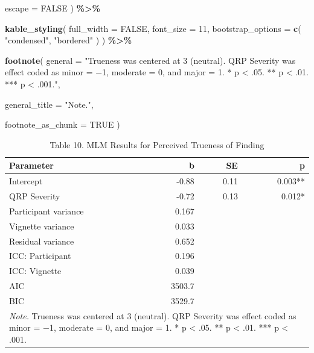 \documentclass[
]{article}
\newenvironment{Shaded}{\begin{snugshade}}{\end{snugshade}}
\newcommand{\AttributeTok}[1]{\textcolor[rgb]{0.13,0.29,0.53}{#1}}
\newcommand{\ConstantTok}[1]{\textcolor[rgb]{0.56,0.35,0.01}{#1}}
\newcommand{\DecValTok}[1]{\textcolor[rgb]{0.00,0.00,0.81}{#1}}
\newcommand{\FunctionTok}[1]{\textcolor[rgb]{0.13,0.29,0.53}{\textbf{#1}}}
\newcommand{\NormalTok}[1]{#1}
\newcommand{\SpecialCharTok}[1]{\textcolor[rgb]{0.81,0.36,0.00}{\textbf{#1}}}
\newcommand{\StringTok}[1]{\textcolor[rgb]{0.31,0.60,0.02}{#1}}
\begin{document}
\begin{Shaded}
\begin{Highlighting}[]
    \AttributeTok{escape =} \ConstantTok{FALSE}
\NormalTok{  ) }\SpecialCharTok{\%\textgreater{}\%}

  \FunctionTok{kable\_styling}\NormalTok{(}
    \AttributeTok{full\_width =} \ConstantTok{FALSE}\NormalTok{,}
    \AttributeTok{font\_size =} \DecValTok{11}\NormalTok{,}
    \AttributeTok{bootstrap\_options =}
      \FunctionTok{c}\NormalTok{(}
        \StringTok{"condensed"}\NormalTok{,}
        \StringTok{"bordered"}
\NormalTok{      )}
\NormalTok{  ) }\SpecialCharTok{\%\textgreater{}\%}

  \FunctionTok{footnote}\NormalTok{(}
    \AttributeTok{general =}
      \StringTok{"Trueness was centered at 3 (neutral). QRP Severity was effect coded as minor = −1, moderate = 0, and major = 1. * p \textless{} .05. ** p \textless{} .01. *** p \textless{} .001."}\NormalTok{,}

    \AttributeTok{general\_title =}
      \StringTok{"Note."}\NormalTok{,}

    \AttributeTok{footnote\_as\_chunk =}
      \ConstantTok{TRUE}
\NormalTok{  )}
\end{Highlighting}
\end{Shaded}

\begingroup\fontsize{11}{13}\selectfont

\begin{longtable}[t]{lrrr}
\caption{\label{tab:trueness-table}Table 10. MLM Results for Perceived Trueness of Finding}\\
\toprule
Parameter & b & SE & p\\
\midrule
Intercept & -0.88 & 0.11 & 0.003**\\
QRP Severity & -0.72 & 0.13 & 0.012*\\
Participant variance & 0.167 &  & \\
Vignette variance & 0.033 &  & \\
Residual variance & 0.652 &  & \\
\addlinespace
ICC: Participant & 0.196 &  & \\
ICC: Vignette & 0.039 &  & \\
AIC & 3503.7 &  & \\
BIC & 3529.7 &  & \\
\bottomrule
\multicolumn{4}{l}{\rule{0pt}{1em}\textit{Note.} Trueness was centered at 3 (neutral). QRP Severity was effect coded as minor = −1, moderate = 0, and major = 1. * p < .05. ** p < .01. *** p < .001.}\\
\end{longtable}
\endgroup{}
\end{document}
